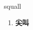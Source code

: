 
\begin{frame}
{\huge squall}
\begin{center}
\begin{enumerate}\Large
  \item \textbf{尖叫}
\end{enumerate}
\end{center}
\end{frame}
